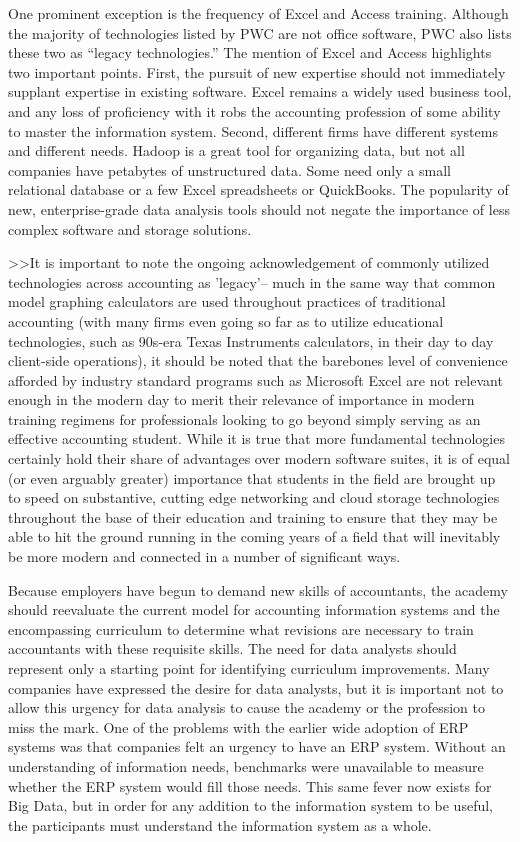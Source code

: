 \documentclass[12pt]{article}
\begin{document}
One prominent exception is the frequency of Excel and Access training. Although the majority of technologies listed by PWC are not office software, PWC also lists these two as ``legacy technologies.'' The mention of Excel and Access highlights two important points. First, the pursuit of new expertise should not immediately supplant expertise in existing software. Excel remains a widely used business tool, and any loss of proficiency with it robs the accounting profession of some ability to master the information system. Second, different firms have different systems and different needs. Hadoop is a great tool for organizing data, but not all companies have petabytes of unstructured data. Some need only a small relational database or a few Excel spreadsheets or QuickBooks. The popularity of new, enterprise-grade data analysis tools should not negate the importance of less complex software and storage solutions.

>>It is important to note the ongoing acknowledgement of commonly utilized technologies across accounting as 'legacy'-- much in the same way that common model graphing calculators are used throughout practices of traditional accounting (with many firms even going so far as to utilize educational technologies, such as 90s-era Texas Instruments calculators, in their day to day client-side operations), it should be noted that the barebones level of convenience afforded by industry standard programs such as Microsoft Excel are not relevant enough in the modern day to merit their relevance of importance in modern training regimens for professionals looking to go beyond simply serving as an effective accounting student. While it is true that more fundamental technologies certainly hold their share of advantages over modern software suites, it is of equal (or even arguably greater) importance that students in the field are brought up to speed on substantive, cutting edge networking and cloud storage technologies throughout the base of their education and training to ensure that they may be able to hit the ground running in the coming years of a field that will inevitably be more modern and connected in a number of significant ways.

Because employers have begun to demand new skills of accountants, the academy should reevaluate the current model for accounting information systems and the encompassing curriculum to determine what revisions are necessary to train accountants with these requisite skills. The need for data analysts should represent only a starting point for identifying curriculum improvements. Many companies have expressed the desire for data analysts, but it is important not to allow this urgency for data analysis to cause the academy or the profession to miss the mark. One of the problems with the earlier wide adoption of ERP systems was that companies felt an urgency to have an ERP system. Without an understanding of information needs, benchmarks were unavailable to measure whether the ERP system would fill those needs. This same fever now exists for Big Data, but in order for any addition to the information system to be useful, the participants must understand the information system as a whole.
\end{document}
